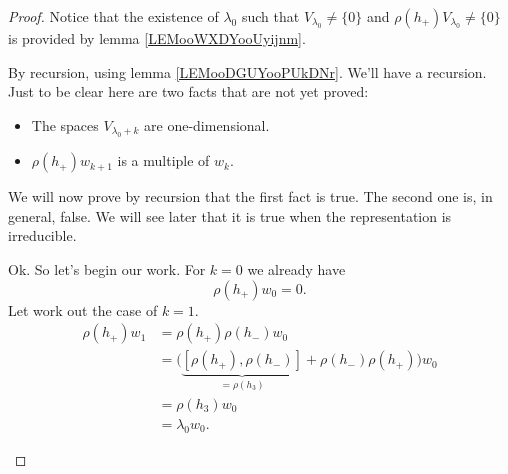 \begin{proof}
	Notice that the existence of \( \lambda_0\) such that \( V_{\lambda_0}\neq \{ 0 \}\) and \( \rho(h_+)V_{\lambda_0}\neq\{ 0 \}\) is provided by lemma \ref{LEMooWXDYooUyijnm}.
	\begin{subproof}
		By recursion, using lemma \ref{LEMooDGUYooPUkDNr}.
		We'll have a recursion. Just to be clear here are two facts that are not yet proved:
		\begin{itemize}
			\item The spaces \( V_{\lambda_0+k}\) are one-dimensional.
			\item \( \rho(h_+)w_{k+1}\) is a multiple of \( w_k\).
		\end{itemize}
		We will now prove by recursion that the first fact is true. The second one is, in general, false. We will see later that it is true when the representation is irreducible.

		Ok. So let's begin our work. For \( k=0\) we already have
		\begin{equation}
			\rho(h_+)w_0=0.
		\end{equation}
		Let work out the case of \( k=1\).
		\begin{subequations}
			\begin{align}
				\rho(h_+)w_1 & =\rho(h_+)\rho(h_-)w_0                                                             \\
				             & =\big( \underbrace{[\rho(h_+),\rho(h_-)]}_{=\rho(h_3)}+\rho(h_-)\rho(h_+) \big)w_0 \\
				             & =\rho(h_3)w_0                                                                      \\
				             & =\lambda_0w_0.
			\end{align}
		\end{subequations}


\end{subproof}
\end{proof}

